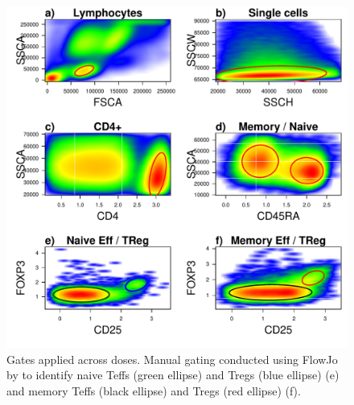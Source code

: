 \begin{figure}[h]
\centering
  \includegraphics[scale=.75]{figures/CB00366X_2012-11-07.pdf}
{Gates applied across doses.}
{
Manual gating conducted using FlowJo by  to identify
naive Teffs (green ellipse) and Tregs (blue ellipse) (e)
and memory Teffs (black ellipse) and Tregs (red ellipse) (f).
}
\end{figure}

